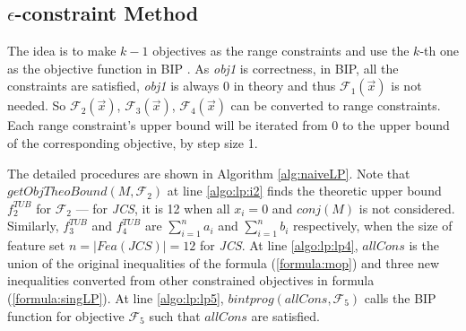 \subsection{$\epsilon$-constraint Method}
The idea is to make $k-1$ objectives as the range constraints and use the $k$-th one as the objective function in BIP \cite{e-constraint}. As \emph{obj1} is correctness, in BIP, all the constraints are satisfied, \emph{obj1} is always 0 in theory and thus $\mathcal{F}_1(\vec x)$ is not needed. So $\mathcal{F}_2(\vec x)$, $\mathcal{F}_3(\vec x)$, $\mathcal{F}_4(\vec x)$ can be converted to range constraints. Each range constraint's upper bound will be iterated from 0 to the upper bound of the corresponding objective, by step size 1.

The detailed procedures are shown in Algorithm \ref{alg:naiveLP}. Note that $getObjTheoBound(M,\mathcal{F}_2)$ at line \ref{algo:lp:i2} finds the theoretic upper bound $f^{TUB}_2$ for $\mathcal{F}_2$ --- for \emph{JCS}, it is 12 when all $x_i=0$  and $conj(M)$ is not considered. Similarly, $f^{TUB}_3$ and $f^{TUB}_4$ are $\sum\nolimits_{i=1}^{n}a_i$ and $\sum\nolimits_{i=1}^{n}b_i$ respectively,  when the size of feature set $n = \mathit{\vert Fea(JCS) \vert} =12$ for \emph{JCS}. At line \ref{algo:lp:lp4},  $allCons$ is the union of the original inequalities of the formula (\ref{formula:mop}) and three new inequalities converted from other constrained objectives in formula  (\ref{formula:singLP}). At line \ref{algo:lp:lp5}, $bintprog(allCons,\mathcal{F}_5)$ calls the BIP function for objective $\mathcal{F}_5$ such that $allCons$ are satisfied.

